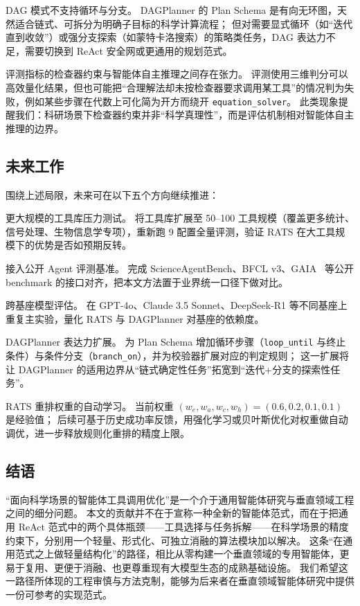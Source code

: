 DAG 模式不支持循环与分支。
DAGPlanner 的 Plan Schema 是有向无环图，天然适合链式、可拆分为明确子目标的科学计算流程；
但对需要显式循环（如“迭代直到收敛”）或强分支探索（如蒙特卡洛搜索）的策略类任务，DAG 表达力不足，需要切换到 ReAct 安全网或更通用的规划范式。

评测指标的检查器约束与智能体自主推理之间存在张力。
评测使用三维判分可以高效量化结果，但也可能把“合理解法却未按检查器要求调用某工具”的情况判为失败，例如某些步骤在代数上可化简为开方而绕开 \texttt{equation\_solver}。
此类现象提醒我们：科研场景下检查器约束并非“科学真理性”，而是评估机制相对智能体自主推理的边界。

\subsection{未来工作}

围绕上述局限，未来可在以下五个方向继续推进：

更大规模的工具库压力测试。
将工具库扩展至 50--100 工具规模（覆盖更多统计、信号处理、生物信息学专项），重新跑 9 配置全量评测，验证 RATS 在大工具规模下的优势是否如预期反转。

接入公开 Agent 评测基准。
完成 ScienceAgentBench、BFCL v3、GAIA~\cite{mialon2023gaia} 等公开 benchmark 的接口对齐，把本文方法置于业界统一口径下做对比。

跨基座模型评估。
在 GPT-4o、Claude 3.5 Sonnet、DeepSeek-R1 等不同基座上重复主实验，量化 RATS 与 DAGPlanner 对基座的依赖度。

DAGPlanner 表达力扩展。
为 Plan Schema 增加循环步骤（\texttt{loop\_until} 与终止条件）与条件分支（\texttt{branch\_on}），并为校验器扩展对应的判定规则；
这一扩展将让 DAGPlanner 的适用边界从“链式确定性任务”拓宽到“迭代+分支的探索性任务”。

RATS 重排权重的自动学习。
当前权重 $(w_e, w_a, w_c, w_h)=(0.6, 0.2, 0.1, 0.1)$ 是经验值；
后续可基于历史成功率反馈，用强化学习或贝叶斯优化对权重做自动调优，进一步释放规则化重排的精度上限。

\subsection{结语}

“面向科学场景的智能体工具调用优化”是一个介于通用智能体研究与垂直领域工程之间的细分问题。
本文的贡献并不在于宣称一种全新的智能体范式，而在于把通用 ReAct 范式中的两个具体瓶颈——工具选择与任务拆解——在科学场景的精度约束下，分别用一个轻量、形式化、可独立消融的算法模块加以解决。
这条“在通用范式之上做轻量结构化”的路径，相比从零构建一个垂直领域的专用智能体，更易于复用、更便于消融、也更尊重现有大模型生态的成熟基础设施。
我们希望这一路径所体现的工程审慎与方法克制，能够为后来者在垂直领域智能体研究中提供一份可参考的实现范式。
